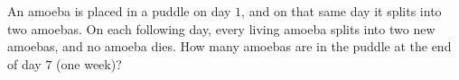 An amoeba is placed in a puddle on day $1$, and on that same day it splits into two amoebas. On each following day, every living amoeba splits into two new amoebas, and no amoeba dies. How many amoebas are in the puddle at the end of day $7$ (one week)?

